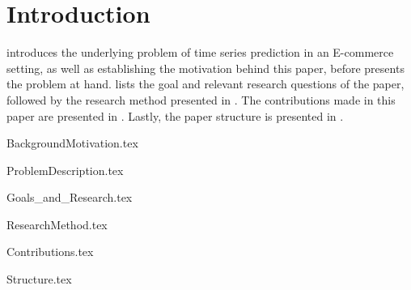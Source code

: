 \chapter{Introduction}
\label{cha:Introduction}

introduces the underlying problem of time series prediction in an E-commerce setting,
as well as establishing the motivation behind this paper,
before 
presents the problem at hand.
 lists the goal and relevant research questions of the paper,
followed by the research method presented in .
The contributions made in this paper are presented in .
Lastly, the paper structure is presented in .



{BackgroundMotivation.tex}

{ProblemDescription.tex}

{Goals_and_Research.tex}

{ResearchMethod.tex}

{Contributions.tex}

{Structure.tex}
